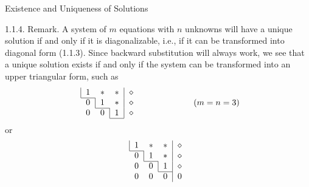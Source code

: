 \documentclass[smaller,hyperref={CJKbookmarks=true}]{beamer}
\begin{document}
\begin{frame}{Existence and Uniqueness of Solutions} \begin{spacing}{1}
\alert{1.1.4. Remark.} A system of $m$ equations with $n$ unknowns will have a
unique solution if and only if it is diagonalizable, i.e., if it can be
transformed into diagonal form (1.1.3). Since backward substitution will
always work, we see that a unique solution exists if and only if the system
can be transformed into an upper triangular form, such as
\begin{equation*}
 \begin{array}{c}
  \begin{tabular}{|ccc|c}
    1 & $\ast$ & $\ast$ & $\diamond$ \\ \cline{1-1}
  \end{tabular} \\
  \begin{tabular}{c|cc|c}
    0 & $1$ & $\ast$ & $\diamond$ \\ \cline{2-2}
  \end{tabular} \\
  \begin{tabular}{cc|c|c}
    0 & $0$ & $1$ & $\diamond$ \\
    \cline{3-3}
  \end{tabular}
\end{array}
\qquad\qquad\qquad(m=n=3)
\end{equation*}
or\\[2.5pt]
\begin{equation*}
 \begin{array}{c}
   \begin{tabular}{|ccc|c}
    1 & $\ast$ & $\ast$ & $\diamond$ \\ \cline{1-1}
  \end{tabular} \\
   \begin{tabular}{c|cc|c}
    0 & $1$ & $\ast$ & $\diamond$ \\ \cline{2-2}
  \end{tabular} \\
   \begin{tabular}{cc|c|c}
    0 & $0$ & $1$ & $\diamond$ \\
    \cline{3-3}
  \end{tabular} \\
  \begin{tabular}{ccc|c}
    0 & $0$ & $0$ & $0$ \\
  \end{tabular} \\

\end{array}
\end{equation*}
\end{spacing}
\end{frame}
\end{document}
